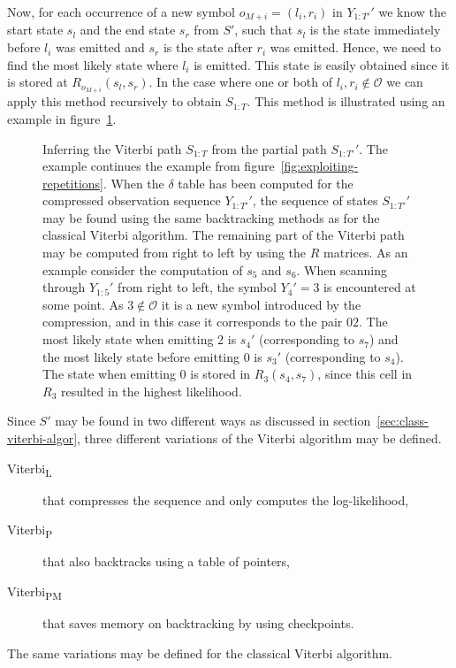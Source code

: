 Now, for each occurrence of a new symbol $o_{M + i} = (l_i, r_i)$ in $Y_{1:T'}'$
we know the start state $s_l$ and the end state $s_r$ from $S'$, such that
$s_l$ is the state immediately before $l_i$ was emitted and $s_r$ is the state
after $r_i$ was emitted. Hence, we need to find the most likely state where
$l_i$ is emitted. This state is easily obtained since it is stored at
$R_{o_{M + i}}(s_l, s_r)$. In the case where one or both of
$l_i, r_i \not \in \mathcal{O}$ we can apply this method recursively to obtain
$S_{1:T}$. This method is illustrated using an example in
figure~\ref{fig:infering-viterbi-path}.

\begin{figure}
  \centering
  
  \caption{Inferring the Viterbi path $S_{1:T}$ from the partial path
    $S_{1:T'}'$. The example continues the example from
    figure~\ref{fig:exploiting-repetitions}. When the $\delta$ table has been
    computed for the compressed observation sequence $Y_{1:T'}'$, the sequence
    of states $S_{1:T'}'$ may be found using the same backtracking methods as
    for the classical Viterbi algorithm. The remaining part of the Viterbi path
    may be computed from right to left by using the $R$ matrices. As an example
    consider the computation of $s_5$ and $s_6$. When scanning through
    $Y_{1:5}'$ from right to left, the symbol $Y_4' = 3$ is encountered at some
    point. As $3 \not \in \mathcal{O}$ it is a new symbol introduced by the
    compression, and in this case it corresponds to the pair $02$. The most
    likely state when emitting 2 is $s_4'$ (corresponding to $s_7$) and the
    most likely state before emitting 0 is $s_3'$ (corresponding to $s_4$). The
    state when emitting 0 is stored in $R_3(s_4, s_7)$, since this cell in
    $R_3$ resulted in the highest likelihood.}
  \label{fig:infering-viterbi-path}
\end{figure}

Since $S'$ may be found in two different ways as discussed in
section~\ref{sec:class-viterbi-algor}, three different variations of the Viterbi
algorithm may be defined.
\begin{description}
\item[Viterbi\textsubscript{L}] that compresses the sequence and only computes the
  log-likelihood,
\item[Viterbi\textsubscript{P}] that also backtracks using a table of pointers,
\item[Viterbi\textsubscript{PM}] that saves memory on backtracking by using checkpoints.
\end{description}
The same variations may be defined for the classical Viterbi algorithm.

